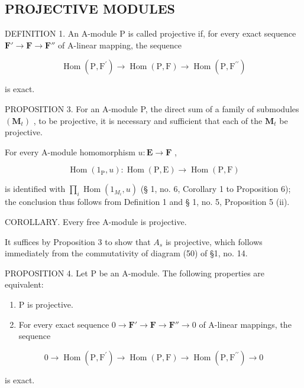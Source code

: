 \subsection{PROJECTIVE MODULES}

DEFINITION 1. An A-module P is called projective if, for every exact sequence \(\mathbf{F}' \to \mathbf{F} \to \mathbf{F}''\) of A-linear mapping, the sequence

\[
\operatorname{Hom} (\mathrm{P}, \mathrm{F} ^ {\prime}) \rightarrow \operatorname{Hom} (\mathrm{P}, \mathrm{F}) \rightarrow \operatorname{Hom} (\mathrm{P}, \mathrm{F} ^ {\prime \prime})
\]

is exact.

PROPOSITION 3. For an A-module P, the direct sum of a family of submodules \((\mathbf{M}_{t})\) , to be projective, it is necessary and sufficient that each of the \(\mathbf{M}_{t}\) be projective.

For every A-module homomorphism \(u: \mathbf{E} \to \mathbf{F}\) ,

\[
\operatorname{Hom} \left(1 _ {\mathrm{P}}, u\right): \operatorname{Hom} (\mathrm{P}, \mathrm{E}) \rightarrow \operatorname{Hom} (\mathrm{P}, \mathrm{F})
\]

is identified with \(\prod_{i}\operatorname{Hom}(1_{M_i},u)\) (§ 1, no. 6, Corollary 1 to Proposition 6); the conclusion thus follows from Definition 1 and § 1, no. 5, Proposition 5 (ii).

COROLLARY. Every free A-module is projective.

It suffices by Proposition 3 to show that \(A_{s}\) is projective, which follows immediately from the commutativity of diagram (50) of §1, no. 14.

PROPOSITION 4. Let P be an A-module. The following properties are equivalent:

\begin{enumerate}
\def\labelenumi{(\alph{enumi})}
\item
  P is projective.
\item
  For every exact sequence \(0 \to \mathbf{F}' \to \mathbf{F} \to \mathbf{F}'' \to 0\) of A-linear mappings, the sequence
\end{enumerate}

\[
0 \rightarrow \operatorname{Hom} (\mathrm{P}, \mathrm{F} ^ {\prime}) \rightarrow \operatorname{Hom} (\mathrm{P}, \mathrm{F}) \rightarrow \operatorname{Hom} (\mathrm{P}, \mathrm{F} ^ {\prime \prime}) \rightarrow 0
\]

is exact.

